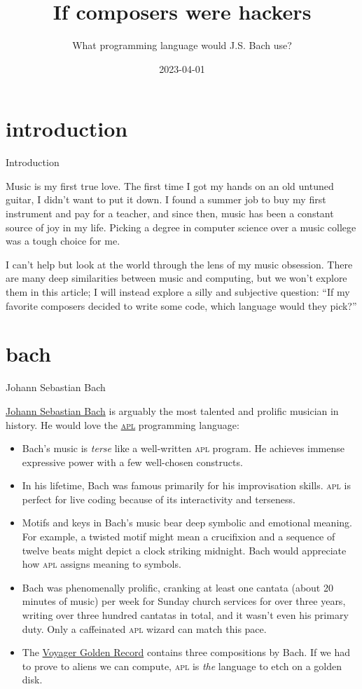\documentclass{article}
\title{If composers were hackers}
\subtitle{What programming language would J.S. Bach use?}
\date{2023-04-01}
\begin{document}
\section{introduction}{Introduction}

Music is my first true love.
The first time I got my hands on an old untuned guitar, I didn't want to put it down.
I found a summer job to buy my first instrument and pay for a teacher, and since then, music has been a constant source of joy in my life.
Picking a degree in computer science over a music college was a tough choice for me.

I can't help but look at the world through the lens of my music obsession.
There are many deep similarities between music and computing,
but we won't explore them in this article;
I will instead explore a silly and subjective question:
``If my favorite composers decided to write some code, which language would they pick?''

\section{bach}{Johann Sebastian Bach}

\href{https://en.wikipedia.org/wiki/Johann_Sebastian_Bach}{Johann Sebastian Bach} is arguably the most talented and prolific musician in history.
He would love the \href{https://en.wikipedia.org/wiki/APL_(programming_language)}{\textsc{apl}} programming language:

\begin{itemize}
  \item
    Bach's music is \emph{terse} like a well-written \textsc{apl} program.
    He achieves immense expressive power with a few well-chosen constructs.
  \item
    In his lifetime, Bach was famous primarily for his improvisation skills.
    \textsc{apl} is perfect for live coding because of its interactivity and terseness.
  \item
    Motifs and keys in Bach's music bear deep symbolic and emotional meaning.
    For example, a twisted motif might mean a crucifixion
    and a sequence of twelve beats might depict a clock striking midnight.
    Bach would appreciate how \textsc{apl} assigns meaning to symbols.
  \item
    Bach was phenomenally prolific, cranking at least one cantata (about 20 minutes of music) per week for Sunday church services for over three years,
    writing over three hundred cantatas in total,
    and it wasn't even his primary duty.
    Only a caffeinated \textsc{apl} wizard can match this pace.
  \item
    The \href{https://en.wikipedia.org/wiki/Contents_of_the_Voyager_Golden_Record}{Voyager Golden Record} contains three compositions by Bach.
    If we had to prove to aliens we can compute,
    \textsc{apl} is \emph{the} language to etch on a golden disk.
\end{itemize}
\end{document}
